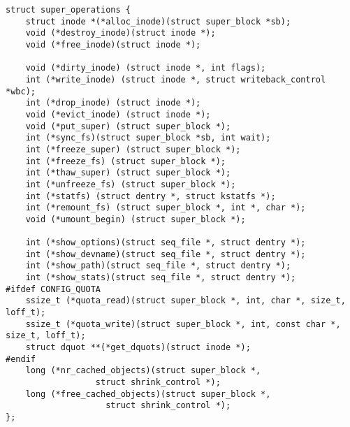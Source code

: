 
\begin{lstlisting}
struct super_operations {
   	struct inode *(*alloc_inode)(struct super_block *sb);
	void (*destroy_inode)(struct inode *);
	void (*free_inode)(struct inode *);

   	void (*dirty_inode) (struct inode *, int flags);
	int (*write_inode) (struct inode *, struct writeback_control *wbc);
	int (*drop_inode) (struct inode *);
	void (*evict_inode) (struct inode *);
	void (*put_super) (struct super_block *);
	int (*sync_fs)(struct super_block *sb, int wait);
	int (*freeze_super) (struct super_block *);
	int (*freeze_fs) (struct super_block *);
	int (*thaw_super) (struct super_block *);
	int (*unfreeze_fs) (struct super_block *);
	int (*statfs) (struct dentry *, struct kstatfs *);
	int (*remount_fs) (struct super_block *, int *, char *);
	void (*umount_begin) (struct super_block *);

	int (*show_options)(struct seq_file *, struct dentry *);
	int (*show_devname)(struct seq_file *, struct dentry *);
	int (*show_path)(struct seq_file *, struct dentry *);
	int (*show_stats)(struct seq_file *, struct dentry *);
#ifdef CONFIG_QUOTA
	ssize_t (*quota_read)(struct super_block *, int, char *, size_t, loff_t);
	ssize_t (*quota_write)(struct super_block *, int, const char *, size_t, loff_t);
	struct dquot **(*get_dquots)(struct inode *);
#endif
	long (*nr_cached_objects)(struct super_block *,
				  struct shrink_control *);
	long (*free_cached_objects)(struct super_block *,
				    struct shrink_control *);
};
\end{lstlisting}
